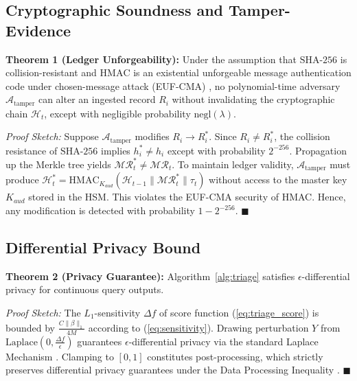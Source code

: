 \documentclass[conference]{IEEEtran}
\begin{document}
\subsection{Cryptographic Soundness and Tamper-Evidence}
\textbf{Theorem 1 (Ledger Unforgeability):} Under the assumption that $\text{SHA-256}$ is collision-resistant and $\text{HMAC}$ is an existential unforgeable message authentication code under chosen-message attack (EUF-CMA) \cite{bellare1993random}, no polynomial-time adversary $\mathcal{A}_{\text{tamper}}$ can alter an ingested record $R_i$ without invalidating the cryptographic chain $\mathcal{H}_t$, except with negligible probability $\text{negl}(\lambda)$.

\textit{Proof Sketch:} Suppose $\mathcal{A}_{\text{tamper}}$ modifies $R_i \to R_i^*$. Since $R_i \ne R_i^*$, the collision resistance of $\text{SHA-256}$ implies $h_i^* \ne h_i$ except with probability $2^{-256}$. Propagation up the Merkle tree yields $\mathcal{MR}_t^* \ne \mathcal{MR}_t$. To maintain ledger validity, $\mathcal{A}_{\text{tamper}}$ must produce $\mathcal{H}_t^* = \text{HMAC}_{K_{aud}}(\mathcal{H}_{t-1} \parallel \mathcal{MR}_t^* \parallel \tau_t)$ without access to the master key $K_{aud}$ stored in the HSM. This violates the EUF-CMA security of HMAC. Hence, any modification is detected with probability $1 - 2^{-256}$. $\blacksquare$

\subsection{Differential Privacy Bound}
\textbf{Theorem 2 (Privacy Guarantee):} Algorithm~\ref{alg:triage} satisfies $\epsilon$-differential privacy for continuous query outputs.

\textit{Proof Sketch:} The $L_1$-sensitivity $\Delta f$ of score function (\ref{eq:triage_score}) is bounded by $\frac{C \|\beta\|_1}{4 M}$ according to (\ref{eq:sensitivity}). Drawing perturbation $Y$ from $\text{Laplace}(0, \frac{\Delta f}{\epsilon})$ guarantees $\epsilon$-differential privacy via the standard Laplace Mechanism \cite{dwork2014algorithmic}. Clamping to $[0, 1]$ constitutes post-processing, which strictly preserves differential privacy guarantees under the Data Processing Inequality \cite{dwork2014algorithmic}. $\blacksquare$
\end{document}
